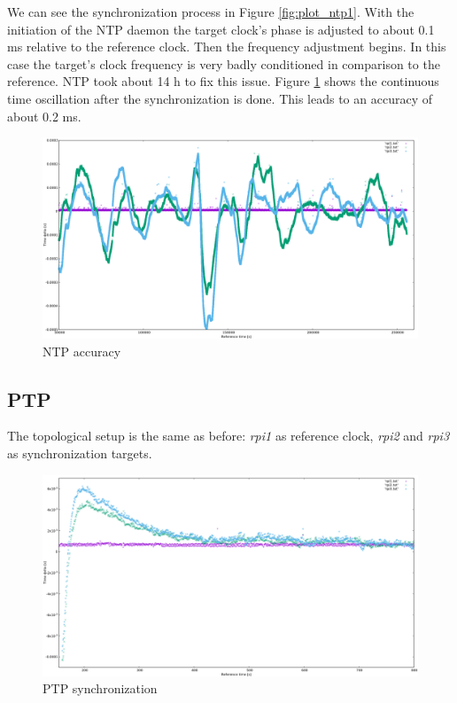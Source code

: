 We can see the synchronization process in Figure \ref{fig:plot_ntp1}. With the initiation of the NTP daemon the target clock's phase is adjusted to about 0.1 ms relative to the reference clock. Then the frequency adjustment begins. In this case the target’s clock frequency is very badly conditioned in comparison to the reference. NTP took about 14 h to fix this issue. Figure \ref{fig:plot_ntp2} shows the continuous time oscillation after the synchronization is done. This leads to an accuracy of about 0.2 ms.

\begin{figure}[tb]
	\centering
	\includegraphics[width=1.0\textwidth]{figures/plot_ntp2.png}
	\caption{NTP accuracy}
	\label{fig:plot_ntp2}
\end{figure}

\subsection{PTP}

The topological setup is the same as before: \textit{rpi1} as reference clock, \textit{rpi2} and \textit{rpi3} as synchronization targets.

\begin{figure}[tb]
	\centering
	\includegraphics[width=1.0\textwidth]{figures/plot_ptp1.png}
	\caption{PTP synchronization}
	\label{fig:plot_ptp1}
\end{figure}

